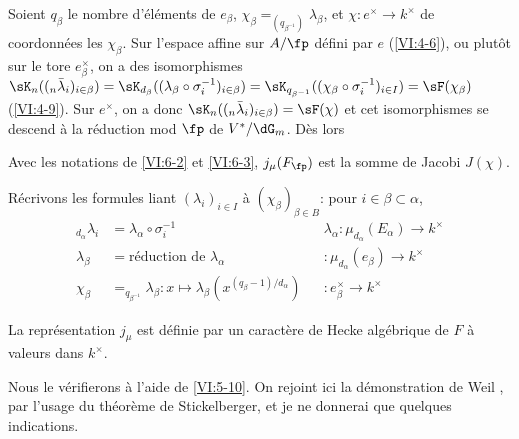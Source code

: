 Soient $q_\beta$ le nombre d'éléments de $e_\beta$, 
$\chi_\beta=_{(q_{\beta^{-1}})} \lambda_\beta$, et 
$\chi:e^\times \to k^\times$ de coordonnées les $\chi_\beta$. Sur l'espace 
affine sur $A/\fp$ défini par $e$ (\ref{VI:4-6}), ou plutôt sur le tore 
$e_\beta^\times$, on a des isomorphismes 
$\sK_n((_n\bar\lambda_i)_{i\in\beta}) = \sK_{d_\beta}((\lambda_\beta \circ \sigma_i^{-1})_{i\in\beta}) =\sK_{q_{\beta^{-1}}}((\chi_\beta\circ \sigma_i^{-1})_{i\in I}) = \sF(\chi_\beta)$ (\ref{VI:4-9}). 
Sur $e^\times$, on a donc $\sK_n((_n\bar\lambda_i)_{i\in \beta}) = \sF(\chi)$ 
et cet isomorphismes se descend à la réduction mod $\fp$ de $V^\ast/\dG_m$. 
Dès lors





\begin{proposition_}\label{VI:6-4}
Avec les notations de \ref{VI:6-2} et \ref{VI:6-3}, $j_\mu(F_\fp)$ est la 
somme de Jacobi $J(\chi)$. 
\end{proposition_}

Récrivons les formules liant $(\lambda_i)_{i\in I}$ à 
$(\chi_\beta)_{\beta\in B}$: pour $i\in \beta\subset \alpha$, 
\begin{align*}
  _{d_\alpha} \lambda_i &= \lambda_\alpha\circ \sigma_i^{-1} && \lambda_\alpha:\mu_{d_\alpha}(E_\alpha) \to k^\times \\
  \lambda_\beta &= \text{réduction de $\lambda_\alpha$} && :\mu_{d_\alpha}(e_\beta) \to k^\times \\
  \chi_\beta &= _{q_{\beta^{-1}}}\lambda_\beta: x\mapsto \lambda_\beta(x^{(q_\beta-1)/d_\alpha}) && :e_\beta^\times \to k^\times 
\end{align*}





\begin{theorem_}\label{VI:6-5}
La représentation $j_\mu$ est définie par un caractère de Hecke 
algébrique de $F$ à valeurs dans $k^\times$. 
\end{theorem_}

Nous le vérifierons à l'aide de \ref{VI:5-10}. On rejoint ici la 
démonstration de Weil \cite{we52,we74-2}, par l'usage du théorème de 
Stickelberger, et je ne donnerai que quelques indications. 





\subsection{}\label{VI:6-6}

